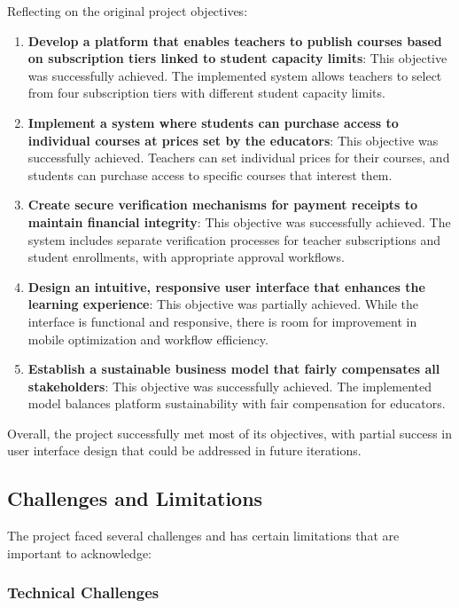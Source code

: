Reflecting on the original project objectives:

\begin{enumerate}
    \item \textbf{Develop a platform that enables teachers to publish courses based on subscription tiers linked to student capacity limits}: This objective was successfully achieved. The implemented system allows teachers to select from four subscription tiers with different student capacity limits.
    
    \item \textbf{Implement a system where students can purchase access to individual courses at prices set by the educators}: This objective was successfully achieved. Teachers can set individual prices for their courses, and students can purchase access to specific courses that interest them.
    
    \item \textbf{Create secure verification mechanisms for payment receipts to maintain financial integrity}: This objective was successfully achieved. The system includes separate verification processes for teacher subscriptions and student enrollments, with appropriate approval workflows.
    
    \item \textbf{Design an intuitive, responsive user interface that enhances the learning experience}: This objective was partially achieved. While the interface is functional and responsive, there is room for improvement in mobile optimization and workflow efficiency.
    
    \item \textbf{Establish a sustainable business model that fairly compensates all stakeholders}: This objective was successfully achieved. The implemented model balances platform sustainability with fair compensation for educators.
\end{enumerate}

Overall, the project successfully met most of its objectives, with partial success in user interface design that could be addressed in future iterations.

\subsection{Challenges and Limitations}

The project faced several challenges and has certain limitations that are important to acknowledge:

\subsubsection{Technical Challenges}

